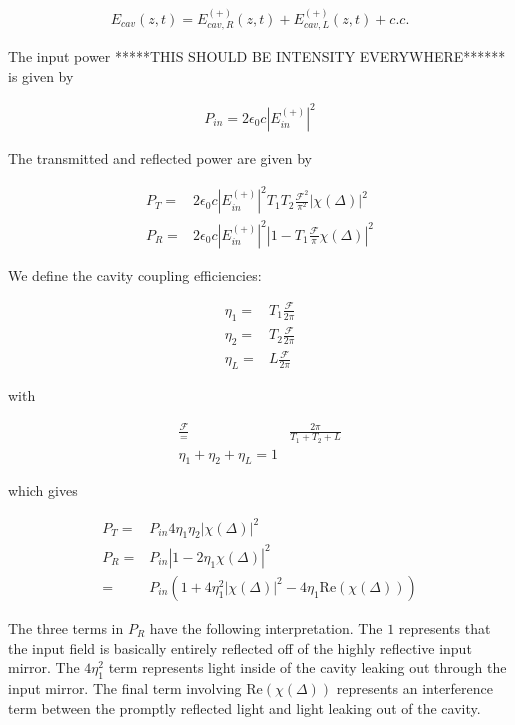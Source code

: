\documentclass[12pt]{article}
\newcommand{\ep}{\epsilon}
\begin{document}
\begin{align}
E_{cav}(z,t) = E^{(+)}_{cav,R}(z, t) + E^{(+)}_{cav,L}(z, t) + c.c.
\end{align}

The input power *****THIS SHOULD BE INTENSITY EVERYWHERE****** is given by

\begin{align}
P_{in} = 2\ep_0 c |E_{in}^{(+)}|^2
\end{align}

The transmitted and reflected power are given by

\begin{align}
P_T =& 2\ep_0 c |E_{in}^{(+)}|^2 T_1 T_2 \frac{\mathcal{F}^2}{\pi^2} |\chi(\Delta)|^2\\
P_R =& 2\ep_0 c |E_{in}^{(+)}|^2 \left|1 - T_1\frac{\mathcal{F}}{\pi}\chi(\Delta)\right|^2
\end{align}

We define the cavity coupling efficiencies:

\begin{align}
\eta_1 =& T_1 \frac{\mathcal{F}}{2\pi}\\
\eta_2 =& T_2 \frac{\mathcal{F}}{2\pi}\\
\eta_L =& L \frac{\mathcal{F}}{2\pi}
\end{align}

with

\begin{align}
\frac{\mathcal{F}} =& \frac{2\pi}{T_1+T_2 + L}\\
\eta_1 + \eta_2 + \eta_L = 1
\end{align}

which gives 

\begin{align}
P_T =& P_{in} 4\eta_1\eta_2 |\chi(\Delta)|^2\\
P_R =& P_{in}\left|1-2\eta_1\chi(\Delta)\right|^2\\
=& P_{in}\left(1 + 4\eta_1^2|\chi(\Delta)|^2 - 4\eta_1\text{Re}\left(\chi(\Delta)\right)\right)
\end{align}

The three terms in $P_R$ have the following interpretation.
The $1$ represents that the input field is basically entirely reflected off of the highly reflective input mirror.
The $4\eta_1^2$ term represents light inside of the cavity leaking out through the input mirror.
The final term involving $\text{Re}(\chi(\Delta))$ represents an interference term between the promptly reflected light and light leaking out of the cavity.
\end{document}
